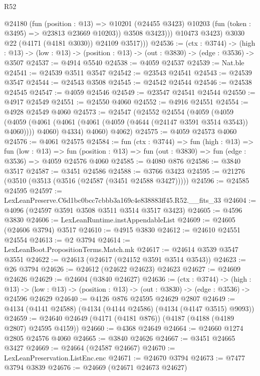 \begin{lexlean}{R52}
\begin{coremodule}
                @24180
                  (fun (position : @13) =>
                  @10201 (@24455 @3423) @10203 (fun (token : @3495) => @23813 @23669 @10203))
                  @3508
                  @3423)))
            @10473
            @3423)
          @3030
          @22
          (@4171 (@4181 @3030))
          @24109
          @3517)))
@24536 := (ctx : @3744) ->
  (high : @13) -> (low : @13) -> (position : @13) -> (out : @3830) -> (edge : @3536) -> @3507
@24537 := @4914 @5540
@24538 := @4059 @24537
@24539 := Nat.ble
@24541 := @24539 @3511 @3547
@24542 := @23543 @24541
@24543 := @24539 @3547
@24544 := @24543 @3508
@24545 := @24542 @24544
@24546 := @24538 @24545
@24547 := @4059 @24546
@24549 := @23547 @24541 @24544
@24550 := @4917 @24549
@24551 := @24550 @4060
@24552 := @4916 @24551
@24554 := @4928 @24549 @4060
@24573 := @24547
    (@24552
      @24554
      (@4059
        (@4059
          (@4059 (@4061 (@4061 (@4061 (@4059 (@4644 (@24147 @3591 @3514 @3543)) @4060)))) @4060)
          @4334)
        @4060)
      @4062)
@24575 := @4059 @24573 @4060
@24576 := @4061 @24575
@24584 := fun (ctx : @3744) =>
  fun (high : @13) =>
  fun (low : @13) =>
  fun (position : @13) => fun (out : @3830) => fun (edge : @3536) => @4059 @24576 @4060
@24585 := @4080 @876
@24586 := @3840 @3517
@24587 := @3451 @24586
@24588 := @3766 @3423
@24595 := @21276 (@3510 (@3513 (@3516 (@24587 (@3451 @24588 @3427)))))
@24596 := @24585 @24595
@24597 := LexLeanPreserve.C6d1bc0bcc7cbbb3a169c4e838883ff45.R52.__fits_33
@24604 := @4096 (@24597 @3591 @3508 @3511 @3514 @3517 @3423)
@24605 := @4596 @3830
@24606 := LexLeanRuntime.instAppendableList
@24609 := @24605 (@24606 @3794) @3517
@24610 := @4915 @3830
@24612 := @24610 @24551 @24554
@24613 := @2 @3794
@24614 := LexLeanBoot.PropositionTerms.Match.mk
@24617 := @24614 @3539 @3547 @3551
@24622 := @24613 (@24617 (@24152 @3591 @3514 @3543))
@24623 := @26 @3794
@24626 := @24612 (@24622 @24623) @24623
@24627 := @24609 @24626
@24629 := @24604 (@3840 @24627)
@24636 := (ctx : @3744) ->
  (high : @13) ->
  (low : @13) -> (position : @13) -> (out : @3830) -> (edge : @3536) -> @24596 @24629
@24640 := @4126 @876 @24595 @24629 @2807
@24649 := @4134 (@4141 @24588) (@4134 (@4144 @24586) (@4134 (@4147 @3515) @9093))
@24659 := @24640 @24649 (@4171 (@4181 @876)) (@4187 (@4188 (@4189 @2807) @24595 @4159))
@24660 := @4368 @24649
@24664 := @24660 @1274 @2805 @24576 @4060
@24665 := @3840 @24626
@24667 := @3451 @24665 @3427
@24669 := @24664 (@24587 @24667)
@24670 := LexLeanPreservation.ListEnc.enc
@24671 := @24670 @3794
@24673 := @7477 @3794 @3839
@24676 := @24669 (@24671 @24673 @24627)

\end{coremodule}
\end{lexlean}
